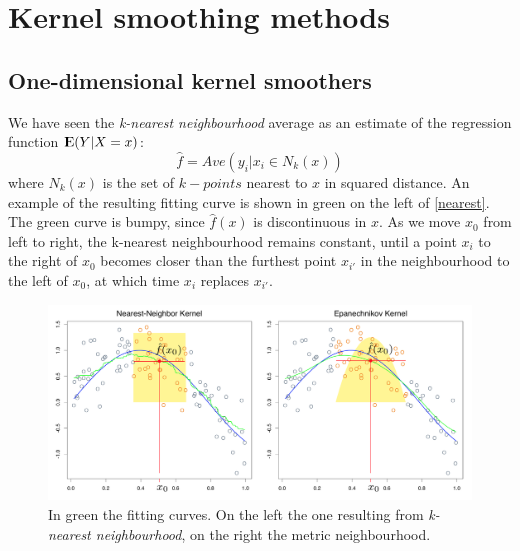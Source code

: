 
\section{Kernel smoothing methods}
\subsection{One-dimensional kernel smoothers}
We have seen the \textit{k-nearest neighbourhood} average as an estimate of the regression function ${\rm I\kern-.3em E}(Y|X=x)$:
\begin{equation}
\hat{f} = Ave(y_i|x_i\in N_k(x))
\end{equation}
where $N_k(x)$ is the set of $k-points$ nearest to $x$ in squared distance. An example of the resulting fitting curve is shown in green on the left of \autoref{nearest}. The green curve is bumpy, since $\hat{f}(x)$ is discontinuous in $x$. As we move $x_0$ from left to right, the k-nearest neighbourhood remains constant, until a point $x_i$ to the right of $x_0$ becomes closer than the furthest point $x_{i'}$ in the neighbourhood to the left of $x_0$, at which time $x_i$ replaces $x_{i'}$. 
\begin{figure}
\centering
\includegraphics[scale=0.38]{img/nearest}
\caption{In green the fitting curves. On the left the one resulting from \textit{k-nearest neighbourhood}, on the right the metric neighbourhood.}
\label{nearest}
\end{figure}

